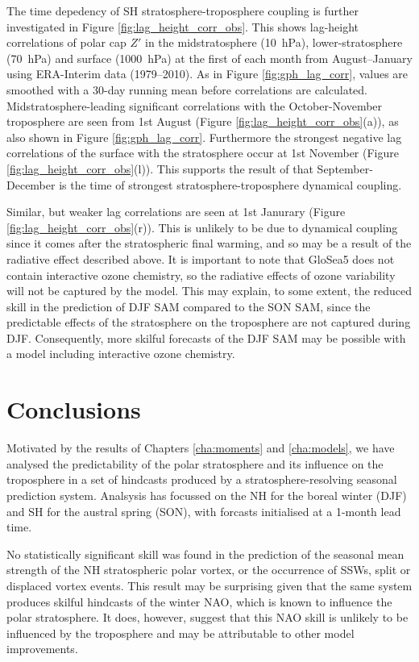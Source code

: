 The time depedency of SH stratosphere-troposphere coupling is further
investigated in Figure \ref{fig:lag_height_corr_obs}. This shows lag-height
correlations of polar cap $Z'$ in the midstratosphere (10~hPa),
lower-stratosphere (70~hPa) and surface (1000~hPa) at the first of each month
from August--January using ERA-Interim data (1979--2010). As in Figure
\ref{fig:gph_lag_corr}, values are smoothed with a 30-day running mean before
correlations are calculated. Midstratosphere-leading significant correlations
with the October-November troposphere are seen from 1st August (Figure
\ref{fig:lag_height_corr_obs}(a)), as also shown in Figure
\ref{fig:gph_lag_corr}. Furthermore the strongest negative lag correlations of
the surface with the stratosphere occur at 1st November (Figure
\ref{fig:lag_height_corr_obs}(l)). This supports the result of
\citet{Shaw2010} that September-December is the time of strongest
stratosphere-troposphere dynamical coupling. 

Similar, but weaker lag correlations are seen at 1st Janurary (Figure
\ref{fig:lag_height_corr_obs}(r)). This is unlikely to be due to dynamical
coupling since it comes after the stratospheric final warming, and so may be a
result of the radiative effect described above. It is important to note that
GloSea5 does not contain interactive ozone chemistry, so the radiative effects
of ozone variability will not be captured by the model. This may explain, to
some extent, the reduced skill in the prediction of DJF SAM compared to the SON
SAM, since the predictable effects of the stratosphere on the troposphere are
not captured during DJF. Consequently, more skilful forecasts of the DJF SAM may
be possible with a model including interactive ozone chemistry. 



\section{Conclusions}
\label{sec:seas-conclusions}

Motivated by the results of Chapters \ref{cha:moments} and \ref{cha:models}, we
have analysed the predictability of the polar stratosphere and its influence on
the troposphere in a set of hindcasts produced by a stratosphere-resolving
seasonal prediction system. Analsysis has focussed on the NH for the boreal
winter (DJF) and SH for the austral spring (SON), with forcasts initialised at a
1-month lead time.

No statistically significant skill was found in the prediction of the seasonal
mean strength of the NH stratospheric polar vortex, or the occurrence of SSWs,
split or displaced vortex events. This result may be surprising given that the
same system produces skilful hindcasts of the winter NAO, which is known to
influence the polar stratosphere. It does, however, suggest that this NAO skill
is unlikely to be influenced by the troposphere and may be attributable to other
model improvements. 

